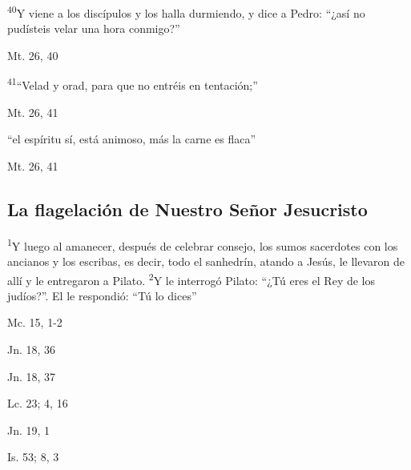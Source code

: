 \documentclass[a4paper,11pt,sans]{article}
\begin{document}
      \textsuperscript{40}Y viene a los discípulos y los halla durmiendo, y dice a Pedro: ``¿así no pudísteis velar una hora conmigo?''
      \begin{center}
        Mt. 26, 40
      \end{center}

      \textsuperscript{41}``Velad y orad, para que no entréis en tentación;''
      \begin{center}
        Mt. 26, 41
      \end{center}

      ``el espíritu sí, está animoso, más la carne es flaca''
      \begin{center}
        Mt. 26, 41
      \end{center}

    \subsection*{\hfil La flagelación de Nuestro Señor Jesucristo \hfil}
      
      \textsuperscript{1}Y luego al amanecer, después de celebrar consejo, los sumos sacerdotes con los ancianos y los escribas, es decir, todo el sanhedrín, atando a Jesús,
      le llevaron de allí y le entregaron a Pilato. \textsuperscript{2}Y le interrogó Pilato: ``¿Tú eres el Rey de los judíos?''. El le respondió: ``Tú lo dices''
      \begin{center}
        Mc. 15, 1-2
      \end{center}

      \begin{center}
        Jn. 18, 36
      \end{center}

      \begin{center}
        Jn. 18, 37
      \end{center}

      \begin{center}
        Lc. 23; 4, 16
      \end{center}

      \begin{center}
        Jn. 19, 1
      \end{center}

      \begin{center}
        Is. 53; 8, 3
      \end{center}
\end{document}
